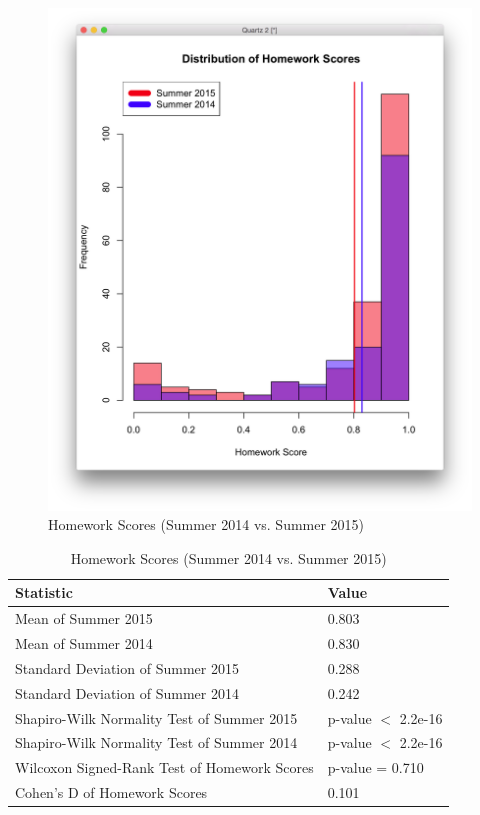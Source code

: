 \begin{figure}
	\centering
	\includegraphics[width=6in]{img/chapter4/hw_su15_vs_su14}
	\caption[Homework Scores (Summer 2014 vs. Summer 2015)]{Homework Scores (Summer 2014 vs. Summer 2015)}
  \label{fig:hwSu14Su15}
\end{figure}

\begin{small}
\begin{table}
  \centering
  \begin{tabular}{|l|l|}
    \hline
    \textbf{Statistic} & \textbf{Value} \\
	\hline
	Mean of Summer 2015 & 0.803 \\
	\hline
	Mean of Summer 2014 & 0.830 \\
	\hline
	Standard Deviation of Summer 2015 & 0.288 \\
	\hline
	Standard Deviation of Summer 2014 & 0.242 \\
	\hline
	Shapiro-Wilk Normality Test of Summer 2015 & p-value $<$ 2.2e-16 \\
	\hline
	Shapiro-Wilk Normality Test of Summer 2014 & p-value $<$ 2.2e-16 \\
	\hline
	Wilcoxon Signed-Rank Test of Homework Scores & p-value = 0.710 \\
	\hline
	Cohen's D of Homework Scores & 0.101 \\
	\hline
  \end{tabular}
	\caption[Homework Scores (Summer 2014 vs. Summer 2015)]{Homework Scores (Summer 2014 vs. Summer 2015)}
  \label{tab:hwSu14Su15}
\end{table}
\end{small}

